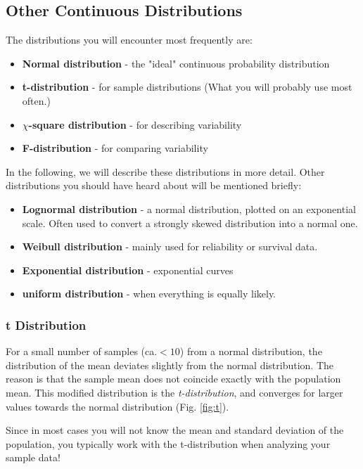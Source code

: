 \subsection{Other Continuous Distributions}\label{sec:ContinuousDistributions} 

The distributions you will encounter most frequently are:

\begin{itemize}
  \item \textbf{Normal distribution} - the "ideal" continuous probability distribution
  \item \textbf{t-distribution} - for sample distributions (What you will probably use most often.)
  \item \textbf{$\chi$-square distribution} - for describing  variability
  \item \textbf{F-distribution} - for comparing variability
\end{itemize}

In the following, we will describe these distributions in more detail. Other distributions you should have heard about will be mentioned briefly:

\begin{itemize}
  \item \textbf{Lognormal distribution} - a normal distribution, plotted on an exponential scale. Often used to convert a strongly skewed distribution into a normal one.
  \item \textbf{Weibull distribution} - mainly used for reliability or survival data.
  \item \textbf{Exponential distribution} - exponential curves
  \item \textbf{uniform distribution} - when everything is equally likely.
\end{itemize}

\subsubsection{t Distribution}
For a small number of samples (ca.$<10$) from a normal distribution, the distribution of the mean deviates slightly from the normal distribution. The reason is that the sample mean does not coincide exactly with the population mean. This modified distribution is the \emph{t-distribution}, and converges for larger values towards the normal distribution (Fig. \ref{fig:t}).

Since in most cases you will not know the mean and standard deviation of the population, you typically work with the t-distribution when analyzing your sample data!

